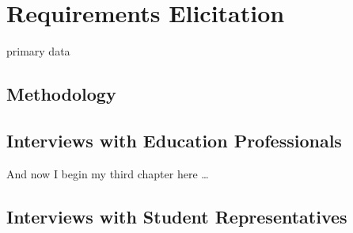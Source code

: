 \chapter{Requirements Elicitation}

primary data

\section{Methodology}

\section{Interviews with Education Professionals}
And now I begin my third chapter here \dots

\section{Interviews with Student Representatives}
